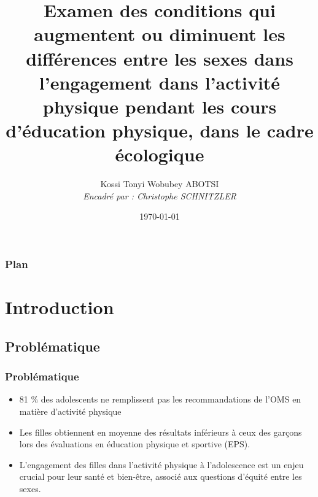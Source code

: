 \documentclass{beamer}
\title{Examen des conditions qui augmentent ou diminuent les différences entre les sexes dans l'engagement dans l'activité physique pendant les cours d'éducation physique, dans le cadre écologique}
\author[Kossi Tonyi Wobubey ABOTSI]{Kossi Tonyi Wobubey ABOTSI \\
	\vspace{0.2cm}
	\textit{Encadré par : Christophe SCHNITZLER}
}
\institute{Stage au Laboratoire E3S}
\date{\today}
\newcommand{\sectiononlytableofcontents}{
	\begin{frame}
		\frametitle{Plan}
		\tableofcontents[hideallsubsections] %
	\end{frame}
}
\begin{document}
	
	{
		\begin{frame}
			\titlepage
		\end{frame}
	}
	
	\sectiononlytableofcontents
	
	\section{Introduction}
	\begin{frame}
		\tableofcontents[sections={1}]
	\end{frame}
	\subsection{Problématique}
	\begin{frame}
		\frametitle{Problématique} 
		\begin{itemize}
			\item 81 \% des adolescents ne remplissent pas les recommandations de l'OMS en matière d'activité physique
			\vfill
			\pause
			\item Les filles obtiennent en moyenne des résultats inférieurs à ceux des garçons lors des évaluations en éducation physique et sportive (EPS).
			\vfill
			\pause
			\item L'engagement des filles dans l'activité physique à l'adolescence est un enjeu crucial pour leur santé et bien-être, associé aux questions d'équité entre les sexes.
		\end{itemize}
	\end{frame}
\end{document}
